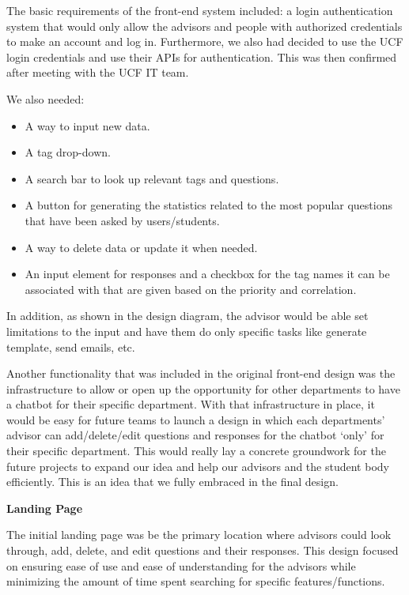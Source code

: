 \documentclass[titlepage, 12pt]{article}
\begin{document}
The basic requirements of the front-end system included: a login authentication system that would only allow the advisors and people with authorized credentials to make an account and log in. Furthermore, we also had decided to use the UCF login credentials and use their APIs for authentication. This was then confirmed after meeting with the UCF IT team.

We also needed:

\begin{itemize}
    \item A way to input new data.
    \item A tag drop-down.
    \item A search bar to look up relevant tags and questions.
    \item A button for generating the statistics related to the most popular questions that have been asked by users/students.
    \item A way to delete data or update it when needed.
    \item An input element for responses and a checkbox for the tag names it can be associated with that are given based on the priority and correlation.
\end{itemize}

In addition, as shown in the design diagram, the advisor would be able set limitations to the input and have them do only specific tasks like generate template, send emails, etc.

Another functionality that was included in the original front-end design was the infrastructure to allow or open up the opportunity for other departments to have a chatbot for their specific department. With that infrastructure in place, it would be easy for future teams to launch a design in which each departments’ advisor can add/delete/edit questions and responses for the chatbot ‘only’ for their specific department. This would really lay a concrete groundwork for the future projects to expand our idea and help our advisors and the student body efficiently. This is an idea that we fully embraced in the final design.

\textbf{Landing Page}

The initial landing page was be the primary location where advisors could look through, add, delete, and edit questions and their responses. This design focused on ensuring ease of use and ease of understanding for the advisors while minimizing the amount of time spent searching for specific features/functions.
\end{document}
